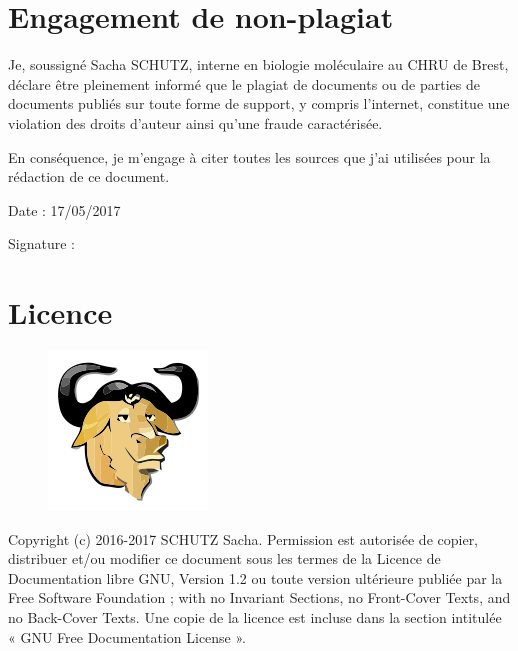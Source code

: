 \documentclass[12pt,a4paper]{article}
\begin{document}

\newpage

\section*{Engagement de non-plagiat}

Je, soussigné Sacha SCHUTZ, interne en biologie moléculaire au CHRU de Brest, déclare être pleinement informé que le plagiat de
documents ou de parties de documents publiés sur toute forme de
support, y compris l'internet, constitue une violation des droits
d'auteur ainsi qu'une fraude caractérisée.

En conséquence, je m'engage à citer toutes les sources que j'ai
utilisées pour la rédaction de ce document.

Date : 17/05/2017

\vspace{0.5cm}

Signature : \\


\vfill

\section*{Licence}

\begin{figure}
\includegraphics[scale=0.5]{img/gfdl.png}\hfill
\end{figure}

Copyright (c) 2016-2017 SCHUTZ Sacha. Permission est autorisée de copier,
distribuer et/ou modifier ce document sous les termes de la Licence de
Documentation libre GNU, Version 1.2 ou toute version ultérieure publiée
par la Free Software Foundation ; with no Invariant Sections, no
Front-Cover Texts, and no Back-Cover Texts. Une copie de la licence est
incluse dans la section intitulée « GNU Free Documentation License ».

\thispagestyle{empty}
\setcounter{page}{0}
\thispagestyle{empty}
\end{document}
